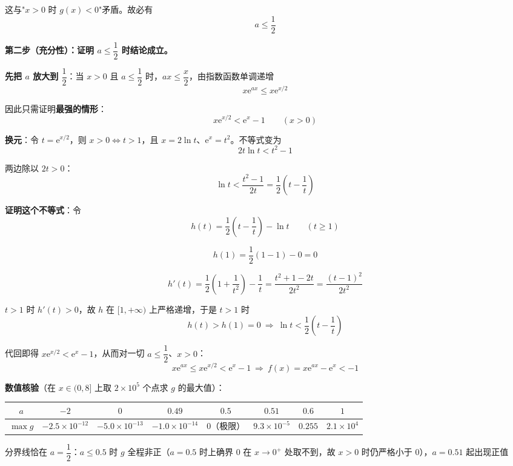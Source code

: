 这与"$x>0$ 时 $g(x)<0$"矛盾。故必有
\[a\le\frac12\]

\par\medskip

\textbf{第二步（充分性）：证明 $a\le\dfrac12$ 时结论成立。}

\textbf{先把 $a$ 放大到 $\dfrac12$}：当 $x>0$ 且 $a\le\dfrac12$ 时，$ax\le\dfrac x2$，由指数函数单调递增
\[x\mathrm e^{ax}\le x\mathrm e^{x/2}\]

因此只需证明\textbf{最强的情形}：
\[x\mathrm e^{x/2}<\mathrm e^{x}-1\qquad(x>0)\]

\textbf{换元}：令 $t=\mathrm e^{x/2}$，则 $x>0\iff t>1$，且 $x=2\ln t$、$\mathrm e^{x}=t^{2}$。不等式变为
\[2t\ln t<t^{2}-1\]

两边除以 $2t>0$：
\[\ln t<\frac{t^{2}-1}{2t}=\frac12\left(t-\frac1t\right)\]

\textbf{证明这个不等式}：令
\[h(t)=\frac12\left(t-\frac1t\right)-\ln t\qquad(t\ge1)\]

\[h(1)=\frac12(1-1)-0=0\]

\[h'(t)=\frac12\left(1+\frac1{t^{2}}\right)-\frac1t=\frac{t^{2}+1-2t}{2t^{2}}=\frac{(t-1)^{2}}{2t^{2}}\]

$t>1$ 时 $h'(t)>0$，故 $h$ 在 $[1,+\infty)$ 上严格递增，于是 $t>1$ 时
\[h(t)>h(1)=0\ \Longrightarrow\ \ln t<\frac12\left(t-\frac1t\right)\]

代回即得 $x\mathrm e^{x/2}<\mathrm e^{x}-1$，从而对一切 $a\le\dfrac12$、$x>0$：
\[x\mathrm e^{ax}\le x\mathrm e^{x/2}<\mathrm e^{x}-1\ \Longrightarrow\ f(x)=x\mathrm e^{ax}-\mathrm e^{x}<-1\]

\gkanswer{答案：$a$ 的取值范围是 $\left(-\infty,\dfrac12\right]$。}

\textbf{数值核验}（在 $x\in(0,8]$ 上取 $2\times10^{5}$ 个点求 $g$ 的最大值）：

\begin{center}
\begingroup\setlength{\tabcolsep}{4pt}
\begin{tabular}{cccccccc}
\toprule
$a$ & $-2$ & $0$ & $0.49$ & $0.5$ & $0.51$ & $0.6$ & $1$ \\
\midrule
$\max g$ & $-2.5\times10^{-12}$ & $-5.0\times10^{-13}$ & $-1.0\times10^{-14}$ & $0$（极限） & $9.3\times10^{-5}$ & $0.255$ & $2.1\times10^{4}$ \\
\bottomrule
\end{tabular}
\endgroup
\end{center}

分界线恰在 $a=\dfrac12$：$a\le0.5$ 时 $g$ 全程非正（$a=0.5$ 时上确界 $0$ 在 $x\to0^{+}$ 处取不到，故 $x>0$ 时仍严格小于 $0$），$a=0.51$ 起出现正值 

